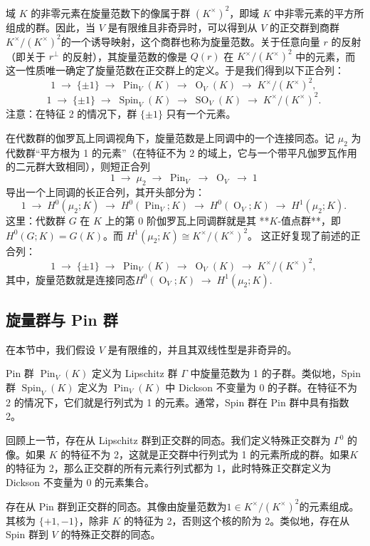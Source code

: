 域 $K$ 的非零元素在旋量范数下的像属于群 $(K^{\times})^{2}$，即域 $K$ 中非零元素的平方所组成的群。因此，当 $V$ 是有限维且非奇异时，可以得到从 $V$ 的正交群到商群
$K^{\times}/(K^{\times})^{2}$的一个诱导映射，这个商群也称为旋量范数。关于任意向量 $r$ 的反射（即关于 $r^{\perp}$ 的反射），其旋量范数的像是 $Q(r)$ 在 $K^{\times}/(K^{\times})^{2}$ 中的元素，而这一性质唯一确定了旋量范数在正交群上的定义。于是我们得到以下正合列：
$$
1 \;\to\; \{\pm 1\} \;\to\; \operatorname{Pin}_{V}(K) \;\to\; \operatorname{O}_{V}(K) \;\to\; K^{\times}/(K^{\times})^{2},~
$$
$$
1 \;\to\; \{\pm 1\} \;\to\; \operatorname{Spin}_{V}(K) \;\to\; \operatorname{SO}_{V}(K) \;\to\; K^{\times}/(K^{\times})^{2}.~
$$
注意：在特征 2 的情况下，群 $\{\pm 1\}$ 只有一个元素。

在代数群的伽罗瓦上同调视角下，旋量范数是上同调中的一个连接同态。记 $\mu_{2}$ 为代数群“平方根为 1 的元素”（在特征不为 2 的域上，它与一个带平凡伽罗瓦作用的二元群大致相同），则短正合列
$$
1 \;\to\; \mu_{2} \;\to\; \operatorname{Pin}_{V} \;\to\; \operatorname{O}_{V} \;\to\; 1~
$$
导出一个上同调的长正合列，其开头部分为：
$$
1 \;\to\; H^{0}(\mu_{2}; K) \;\to\; H^{0}(\operatorname{Pin}_{V}; K) \;\to\; H^{0}(\operatorname{O}_{V}; K) \;\to\; H^{1}(\mu_{2}; K).~
$$
这里：代数群 $G$ 在 $K$ 上的第 0 阶伽罗瓦上同调群就是其 **$K$-值点群**，即 $H^{0}(G; K) = G(K)$。而 $H^{1}(\mu_{2}; K) \cong K^{\times}/(K^{\times})^{2}$。
这正好复现了前述的正合列：
$$
1 \;\to\; \{\pm 1\} \;\to\; \operatorname{Pin}_{V}(K) \;\to\; \operatorname{O}_{V}(K) \;\to\; K^{\times}/(K^{\times})^{2},~
$$
其中，旋量范数就是连接同态$H^{0}(\operatorname{O}_{V}; K) \;\to\; H^{1}(\mu_{2}; K)$.
\subsection{旋量群与 Pin 群}
在本节中，我们假设 $V$ 是有限维的，并且其双线性型是非奇异的。

Pin 群 $\operatorname{Pin}_{V}(K)$ 定义为 Lipschitz 群 $\Gamma$ 中旋量范数为 1 的子群。类似地，Spin 群 $\operatorname{Spin}_{V}(K)$ 定义为 $\operatorname{Pin}_{V}(K)$ 中 Dickson 不变量为 0 的子群。在特征不为 2 的情况下，它们就是行列式为 1 的元素。通常，Spin 群在 Pin 群中具有指数 2。

回顾上一节，存在从 Lipschitz 群到正交群的同态。我们定义特殊正交群为 $\Gamma^{0}$ 的像。如果 $K$ 的特征不为 2，这就是正交群中行列式为 1 的元素所成的群。如果$K$ 的特征为 2，那么正交群的所有元素行列式都为 1，此时特殊正交群定义为 Dickson 不变量为 0 的元素集合。

存在从 Pin 群到正交群的同态。其像由旋量范数为$1 \in K^{\times}/(K^{\times})^{2}$的元素组成。其核为 $\{+1,-1\}$，除非 $K$ 的特征为 2，否则这个核的阶为 2。类似地，存在从 Spin 群到 $V$ 的特殊正交群的同态。

